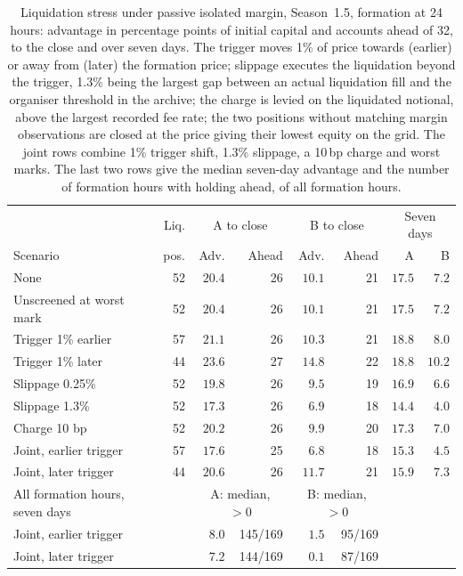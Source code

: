 \begin{table}[ht]
\centering\small
\caption{Liquidation stress under passive isolated margin, Season~1.5,
formation at 24 hours: advantage in percentage points of initial capital and
accounts ahead of 32, to the close and over seven days. The trigger moves 1\%
of price towards (earlier) or away from (later) the formation price;
slippage executes the liquidation beyond the trigger, 1.3\% being the
largest gap between an actual liquidation fill and the organiser threshold
in the archive; the charge is levied on the liquidated notional, above the
largest recorded fee rate; the two positions without matching margin observations are closed at
the price giving their lowest equity on the grid. The joint rows combine 1\% trigger shift, 1.3\% slippage,
a 10\,bp charge and worst marks. The last two rows give the median
seven-day advantage and the number of formation hours with holding ahead,
of all formation hours.}
\label{tab:stress}
\setlength{\tabcolsep}{3.5pt}
\begin{tabular}{lrrrrrrr}
\toprule
 & Liq. & \multicolumn{2}{c}{A to close} & \multicolumn{2}{c}{B to close} & \multicolumn{2}{c}{Seven days} \\
Scenario & pos. & Adv. & Ahead & Adv. & Ahead & A & B \\
\midrule
None & 52 & $20.4$ & 26 & $10.1$ & 21 & $17.5$ & $7.2$ \\
Unscreened at worst mark & 52 & $20.4$ & 26 & $10.1$ & 21 & $17.5$ & $7.2$ \\
Trigger 1\% earlier & 57 & $21.1$ & 26 & $10.3$ & 21 & $18.8$ & $8.0$ \\
Trigger 1\% later & 44 & $23.6$ & 27 & $14.8$ & 22 & $18.8$ & $10.2$ \\
Slippage 0.25\% & 52 & $19.8$ & 26 & $9.5$ & 19 & $16.9$ & $6.6$ \\
Slippage 1.3\% & 52 & $17.3$ & 26 & $6.9$ & 18 & $14.4$ & $4.0$ \\
Charge 10 bp & 52 & $20.2$ & 26 & $9.9$ & 20 & $17.3$ & $7.0$ \\
Joint, earlier trigger & 57 & $17.6$ & 25 & $6.8$ & 18 & $15.3$ & $4.5$ \\
Joint, later trigger & 44 & $20.6$ & 26 & $11.7$ & 21 & $15.9$ & $7.3$ \\
\midrule
All formation hours, seven days & & \multicolumn{2}{c}{A: median, $>0$} & \multicolumn{2}{c}{B: median, $>0$} & & \\
\midrule
Joint, earlier trigger & & $8.0$ & 145/169 & $1.5$ & 95/169 & & \\
Joint, later trigger & & $7.2$ & 144/169 & $0.1$ & 87/169 & & \\
\bottomrule
\end{tabular}
\end{table}
